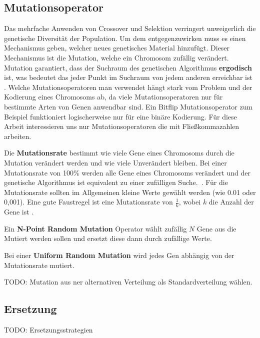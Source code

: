 \subsection{Mutationsoperator}
Das mehrfache Anwenden von Crossover und Selektion verringert unweigerlich die genetische Diversität der Population. Um dem entgegenzuwirken muss es einen Mechanismus geben, welcher neues genetisches Material hinzufügt. Dieser Mechanismus ist die Mutation, welche ein Chromosom zufällig verändert. Mutation garantiert, dass der Suchraum des genetischen Algorithmus \textbf{ergodisch} ist, was bedeutet das jeder Punkt im Suchraum von jedem anderen erreichbar ist \cite*{TerminologiesAndOperators}. Welche Mutationsoperatoren man verwendet hängt stark vom Problem und der Kodierung eines Chromosoms ab, da viele Mutationsoperatoren nur für bestimmte Arten von Genen anwendbar sind. Ein Bitflip Mutationsoperator zum Beispiel funktioniert logischerweise nur für eine binäre Kodierung. Für diese Arbeit interessieren uns nur Mutationsoperatoren die mit Fließkommazahlen arbeiten.

Die \textbf{Mutationsrate} bestimmt wie viele Gene eines Chromosoms durch die Mutation verändert werden und wie viele Unverändert bleiben. Bei einer Mutationsrate von 100\% werden alle Gene eines Chromosoms verändert  und der genetische Algorithmus ist equivalent zu einer zufälligen Suche.~\cite*{TerminologiesAndOperators}. Für die Mutationsrate sollten im Allgemeinen kleine Werte gewählt werden (wie 0.01 oder 0,001). Eine gute Faustregel ist eine Mutationsrate von $\frac{1}{k}$, wobei $k$ die Anzahl der Gene ist \cite*{MetaheuristicsEGT}.

Ein \textbf{N-Point Random Mutation} Operator wählt zufällig $N$ Gene aus die Mutiert werden sollen und ersetzt diese dann durch zufällige Werte.

Bei einer \textbf{Uniform Random Mutation} wird jedes Gen abhängig von der Mutationsrate mutiert.

TODO: Mutation aus ner alternativen Verteilung als Standardverteilung wählen.

\subsection*{Ersetzung}
TODO: Ersetzungsstrategien

